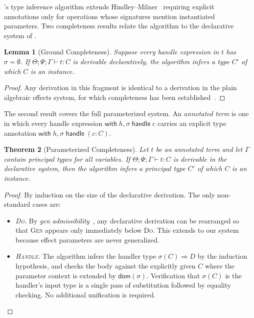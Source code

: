 \documentclass{article}
\newtheorem{theorem}{Theorem}[section]
\newtheorem{lemma}[theorem]{Lemma}
\theoremstyle{definition}
\theoremstyle{remark}
\newcommand{\with}{\mathsf{with}\;}
\newcommand{\handle}{\;\mathsf{handle}\;}
\newcommand{\dom}{\mathsf{dom}}
\newcommand{\G}{\Gamma}
\newcommand{\cjp}[5]{#1; #2; #3 \vdash #4 : #5}                  %
\begin{document}
\cambria{}'s type inference algorithm extends Hindley--Milner~\cite{damas_principal_1982}
requiring explicit annotations only for operations whose signatures mention instantiated parameters.
Two completeness results relate the algorithm to the declarative system of .

\begin{lemma}[Ground Completeness] \label{thm:ground-complete}
  Suppose every handle expression in $t$ has $\sigma = \emptyset$.
  If\/ $\cjp{\Theta}{\Psi}{\G}{t}{C}$ is derivable declaratively, the algorithm infers
  a type $C'$ of which $C$ is an instance.
\end{lemma}

\begin{proof}
  Any derivation in this fragment is identical to a derivation in the plain algebraic effects system,
  for which completeness has been established~\cite{kammar_no_2017}.
\end{proof}

The second result covers the full parameterized system.
An \emph{annotated term} is one in which every handle expression
$\with h, \sigma \handle c$ carries an explicit type annotation
$\with h, \sigma \handle (c : C)$.

\begin{theorem}[Parameterized Completeness]\label{thm:param-complete}
  Let $t$ be an annotated term and let $\G$ contain principal types for all variables.
  If $\cjp{\Theta}{\Psi}{\G}{t}{C}$ is derivable in the declarative system, then the
  algorithm infers a principal type $C'$ of which $C$ is an instance.
\end{theorem}

\begin{proof}
  By induction on the size of the declarative derivation. The only non-standard cases are:
  \begin{itemize}
    \item \emph{\textsc{Do}.}
          By \emph{gen admissibility}~\cite{damas_principal_1982}, any declarative derivation
          can be rearranged so that \textsc{Gen} appears only immediately below
          \textsc{Do}. This extends to our system because effect parameters are never generalized.

    \item \emph{\textsc{Handle}.}
          The algorithm infers the handler type
          $\sigma(C) \Rightarrow D$ by the induction hypothesis, and checks the body against the explicitly given $C$
          where the parameter context is extended by $\dom(\sigma)$.
          Verification that $\sigma(C)$ is the handler's input type is a single pass of
          substitution followed by equality checking.
          No additional unification is required.
  \end{itemize}
\end{proof}
\end{document}
